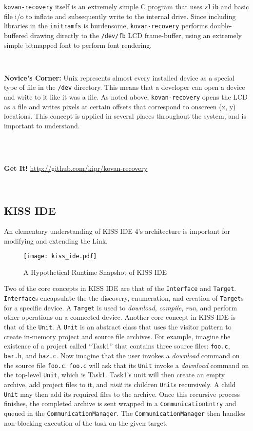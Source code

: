 \documentclass[12pt,letterpaper]{article}
\newcommand{\bcolorbox}[4]{\noindent \\ \fcolorbox{#1}{#2} {\parbox{\textwidth}{\vspace{.1em}\textbf{#3} #4\vspace{.1em}}} \\}
\newcommand{\novice}[1]{\bcolorbox{green}{Honeydew}{Novice's Corner:}{#1}}
\newcommand{\getit}[1]{\bcolorbox{Indigo}{Lavender}{Get It!}{#1}}
\begin{document}
	\texttt{kovan-recovery} itself is an extremely simple C program that uses \texttt{zlib} and basic file i/o to inflate and subsequently write
	to the internal drive. Since including libraries in the \texttt{initramfs} is burdensome, \texttt{kovan-recovery} performs double-buffered
	drawing directly to the \texttt{/dev/fb} LCD frame-buffer, using an extremely simple bitmapped font to perform font rendering.
	
	\novice{Unix represents almost every installed device as a special type of file in the \texttt{/dev} directory. This means that
	a developer can open a device and write to it like it was a file. As noted above, \texttt{kovan-recovery} opens the LCD as a file and
	writes pixels at certain offsets that correspond to onscreen (x, y) locations. This concept is applied in several places throughout the system, and is important to understand.}
	\getit{\url{http://github.com/kipr/kovan-recovery}}
	
	\subsection{KISS IDE}
	An elementary understanding of KISS IDE 4's architecture is important for modifying and extending the Link.
	
	\begin{figure}[H]
		\begin{center}
			\texttt{[image: kiss\_ide.pdf]}
			\caption{A Hypothetical Runtime Snapshot of KISS IDE}
		\end{center}
	\end{figure}
	
	Two of the core concepts in KISS IDE are that of the \texttt{Interface} and \texttt{Target}. \texttt{Interface}s encapsulate
	the the discovery, enumeration, and creation of \texttt{Target}s for a specific device. A \texttt{Target} is used to \emph{download},
	\emph{compile}, \emph{run}, and perform other operations on a connected device. Another core concept in KISS IDE is that of the
	\texttt{Unit}. A \texttt{Unit} is an abstract class that uses the visitor pattern to create in-memory project and source file archives.
	For example, imagine the existence of a project called ``Task1'' that contains three source files: \texttt{foo.c}, \texttt{bar.h}, and 
	\texttt{baz.c}. 
	Now imagine that the user invokes a \emph{download} command on the source file \texttt{foo.c}. \texttt{foo.c} will ask that its 	\texttt{Unit} invoke a \emph{download} command on the top-level \texttt{Unit}, which is Task1. Task1's unit will then create an empty archive,
	add project files to it, and \emph{visit} its children \texttt{Unit}s recursively. A child \texttt{Unit} may then add its required files
	to the archive. Once this recursive process finishes, the completed archive is sent wrapped in a \texttt{CommunicationEntry} and queued in
	the \texttt{CommunicationManager}. The \texttt{CommunicationManager} then handles non-blocking execution of the task on the given target.
	
\end{document}
